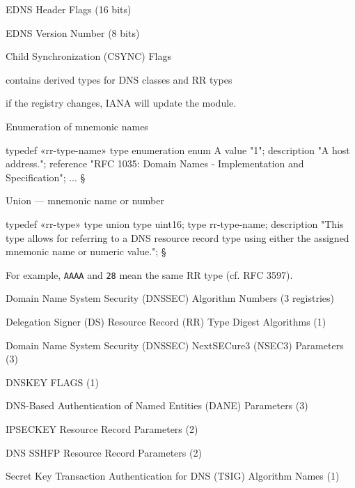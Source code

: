 \item EDNS Header Flags (16 bits)

\item EDNS Version Number (8 bits)

\item Child Synchronization (CSYNC) Flags

\endBulletList


\bulletList

\item contains derived types for DNS classes and RR types

\item if the registry changes, IANA will update the module. 

\endBulletList


\numberList

\item Enumeration of mnemonic names

\verbatim
typedef «rr-type-name» {
  type enumeration {
    enum A {
      value "1";
      description
        "A host address.";
      reference
        "RFC 1035: Domain Names - Implementation and
         Specification";
    }
    ...
  }
}
§

\slide

\item Union --- mnemonic name or number

\verbatim
typedef «rr-type» {
  type union {
    type uint16;
    type rr-type-name;
  }
  description
    "This type allows for referring to a DNS resource
     record type using either the assigned mnemonic
     name or numeric value.";
}
§

For example, {\tt AAAA} and {\tt 28} mean the same RR type (cf. RFC 3597). 

\endNumberList


\bulletList

\item Domain Name System Security (DNSSEC) Algorithm Numbers (3 registries)

\item Delegation Signer (DS) Resource Record (RR) Type Digest
Algorithms (1)

\item Domain Name System Security (DNSSEC) NextSECure3 (NSEC3)
Parameters (3)

\item DNSKEY FLAGS (1)

\item DNS-Based Authentication of Named Entities (DANE) Parameters (3)

\item IPSECKEY Resource Record Parameters (2)

\item DNS SSHFP Resource Record Parameters (2)

\item Secret Key Transaction Authentication for DNS (TSIG) Algorithm
Names (1)

\endBulletList

\bye
